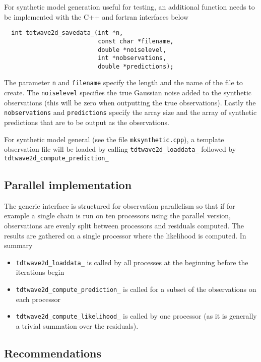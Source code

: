 \documentclass[a4paper,12pt]{article}
\begin{document}
For synthetic model generation useful for testing, an additional function needs to be
implemented with the C++ and fortran interfaces below

\begin{verbatim}
  int tdtwave2d_savedata_(int *n,
                          const char *filename,
                          double *noiselevel,
                          int *nobservations,
                          double *predictions);
\end{verbatim}

The parameter {\tt n} and {\tt filename} specify the length and the name
of the file to create. The {\tt noiselevel} specifies the true Gaussian
noise added to the synthetic observations (this will be zero when
outputting the true observations). Lastly the {\tt nobservations} and
{\tt predictions} specify the array size and the array of synthetic
predictions that are to be output as the observations.

For synthetic model general (see the file {\tt mksynthetic.cpp}), a
template observation file will be loaded by calling {\tt tdtwave2d\_loaddata\_}
followed by {\tt tdtwave2d\_compute\_prediction\_} 

\subsection{Parallel implementation}

The generic interface is structured for observation parallelism so that if for example
a single chain is run on ten processors using the parallel version, observations are
evenly split between processors and residuals computed. The results are gathered on
a single processor where the likelihood is computed. In summary

\begin{itemize}
\item {\tt tdtwave2d\_loaddata\_} is called by all processes at the beginning before
  the iterations begin
\item {\tt tdtwave2d\_compute\_prediction\_} is called for a subset of the observations
  on each processor
\item {\tt tdtwave2d\_compute\_likelihood\_} is called by one processor (as it is
  generally a trivial summation over the residuals).
\end{itemize}

\subsection{Recommendations}
\end{document}
